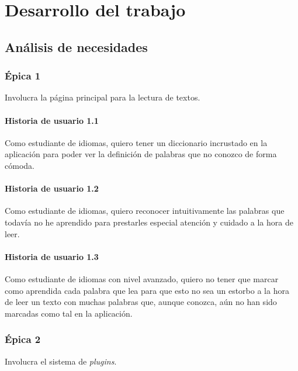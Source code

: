 \chapter{Desarrollo del trabajo}  

\section{Análisis de necesidades}


\subsection{Épica 1}

Involucra la página principal para la lectura de textos.

\subsubsection{Historia de usuario 1.1}

Como estudiante de idiomas, quiero tener un diccionario incrustado en la aplicación para poder ver la definición de palabras que no conozco de forma cómoda.

\subsubsection{Historia de usuario 1.2}

Como estudiante de idiomas, quiero reconocer intuitivamente las palabras que todavía no he aprendido para prestarles especial atención y cuidado a la hora de leer.

\subsubsection{Historia de usuario 1.3}

Como estudiante de idiomas con nivel avanzado, quiero no tener que marcar como aprendida cada palabra que lea para que esto no sea un estorbo a la hora de leer un texto con muchas palabras que, aunque conozca, aún no han sido marcadas como tal en la aplicación.

\subsection{Épica 2}

Involucra el sistema de \textit{plugins}.

